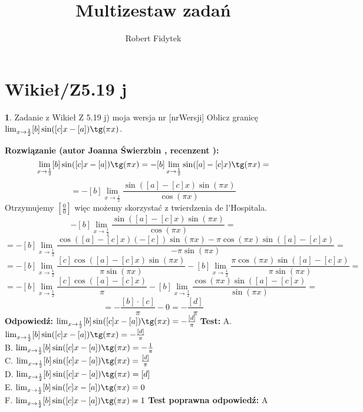 \documentclass[12pt, a4paper]{article}
\title{Multizestaw zadań}
\author{Robert Fidytek}
\date{}
\theoremstyle{definition} %
\newtheorem{zad}{}
\newcommand{\kategoria}[1]{\section{#1}} %
\newcommand{\zadStart}[1]{\begin{zad}#1\newline} %
\newcommand{\zadStop}{\end{zad}}   %
\newcommand{\rozwStart}[2]{\noindent \textbf{Rozwiązanie (autor #1 , recenzent #2): }\newline} %
\newcommand{\rozwStop}{\newline}                                            %
\newcommand{\odpStart}{\noindent \textbf{Odpowiedź:}\newline}    %
\newcommand{\odpStop}{\newline}                                             %
\newcommand{\testStart}{\noindent \textbf{Test:}\newline} %
\newcommand{\testStop}{\newline} %
\newcommand{\kluczStart}{\noindent \textbf{Test poprawna odpowiedź:}\newline} %
\newcommand{\kluczStop}{\newline} %
\begin{document}
\maketitle


\kategoria{Wikieł/Z5.19 j}
\zadStart{Zadanie z Wikieł Z 5.19 j) moja wersja nr [nrWersji]}
Oblicz granicę $\lim_{x \rightarrow \frac{1}{2}} [b]\sin([c]x-[a])\tg(\pi x)$.
\zadStop
\rozwStart{Joanna Świerzbin}{}
$$\lim_{x \rightarrow \frac{1}{2}} [b]\sin([c]x-[a])\tg(\pi x)=-[b] \lim_{x \rightarrow \frac{1}{2}} \sin([a]-[c]x)\tg(\pi x)=$$
$$=-[b] \lim_{x \rightarrow \frac{1}{2}} \frac{\sin([a]-[c]x) \sin(\pi x)}{\cos(\pi x)}$$
Otrzymujemy $ \left[ \frac{0}{0} \right] $ więc możemy skorzystać z twierdzenia de l'Hospitala.
$$-[b] \lim_{x \rightarrow \frac{1}{2}} \frac{\sin([a]-[c]x) \sin(\pi x)}{\cos(\pi x)}=$$
$$=-[b] \lim_{x \rightarrow \frac{1}{2}} \frac{\cos([a]-[c]x) (-[c]) \sin(\pi x) -\pi \cos(\pi x) \sin([a]-[c]x)}{-\pi \sin(\pi x)}=$$
$$=-[b] \lim_{x \rightarrow \frac{1}{2}} \frac{[c] \cos([a]-[c]x) \sin(\pi x) }{\pi \sin(\pi x)}-[b] \lim_{x \rightarrow \frac{1}{2}} \frac{\pi \cos(\pi x) \sin([a]-[c]x)}{\pi \sin(\pi x)} = $$
$$=-[b] \lim_{x \rightarrow \frac{1}{2}} \frac{[c] \cos([a]-[c]x)}{\pi}-[b] \lim_{x \rightarrow \frac{1}{2}} \frac{ \cos(\pi x) \sin([a]-[c]x)}{ \sin(\pi x)} = $$
$$=-\frac{[b]\cdot[c]}{\pi} -0 = -\frac{[d]}{\pi}$$
\rozwStop
\odpStart
$\lim_{x \rightarrow \frac{1}{2}} [b]\sin([c]x-[a])\tg(\pi x) =  -\frac{[d]}{\pi} $
\odpStop
\testStart
A. $\lim_{x \rightarrow \frac{1}{2}} [b]\sin([c]x-[a])\tg(\pi x) =  -\frac{[d]}{\pi} $\\
B. $\lim_{x \rightarrow \frac{1}{2}} [b]\sin([c]x-[a])\tg(\pi x) =  -\frac{1}{\pi} $\\
C. $\lim_{x \rightarrow \frac{1}{2}} [b]\sin([c]x-[a])\tg(\pi x) =  \frac{[d]}{\pi} $\\
D. $\lim_{x \rightarrow \frac{1}{2}} [b]\sin([c]x-[a])\tg(\pi x) =  [d] $\\
E. $\lim_{x \rightarrow \frac{1}{2}} [b]\sin([c]x-[a])\tg(\pi x) =  0 $\\
F. $\lim_{x \rightarrow \frac{1}{2}} [b]\sin([c]x-[a])\tg(\pi x) =  1 $
\testStop
\kluczStart
A
\kluczStop
\end{document}
